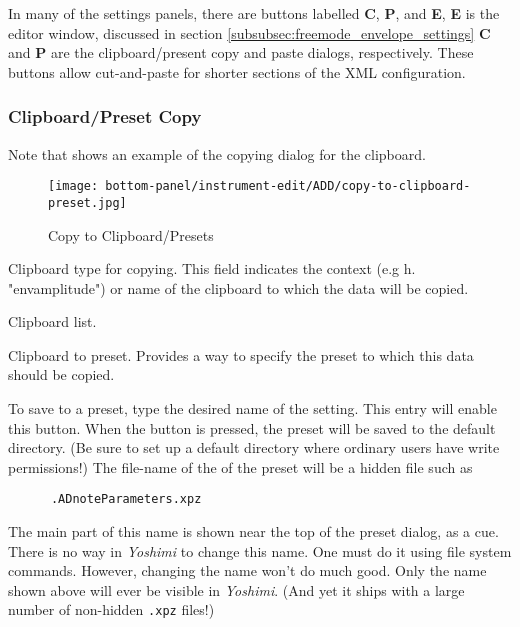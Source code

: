    In many of the settings panels, there are buttons
   labelled \textbf{C}, \textbf{P}, and \textbf{E},
   \textbf{E} is the editor window, discussed in 
   section \ref{subsubsec:freemode_envelope_settings}
   \textbf{C} and \textbf{P} are the clipboard/present copy and paste
   dialogs, respectively.
   These buttons allow cut-and-paste for shorter sections of the XML
   configuration.

\subsubsection{Clipboard/Preset Copy}
\label{subsubsec:clipboard_copy}

   Note that 
   shows an example of the copying dialog for the clipboard.

\begin{figure}[H]
   \centering 
   \texttt{[image: bottom-panel/instrument-edit/ADD/copy-to-clipboard-preset.jpg]}
   \caption[Copy to Clipboard]{Copy to Clipboard/Presets}
   \label{fig:copy_to_clipboard} 
\end{figure}

   \setcounter{ItemCounter}{0}      %

   Clipboard type for copying.
   This field indicates the context (e.g h. "envamplitude") or name of the
   clipboard to which the data will be copied.

   Clipboard list.

   Clipboard to preset.
   Provides a way to specify the preset to which this data should be
   copied.

   To save to a preset, type the desired name of the setting.  This entry
   will enable this button.  When the button is pressed, the preset will
   be saved to the default directory.
   (Be sure to set up a default directory where ordinary users have write
   permissions!)
   The file-name of the of the preset will be a hidden file such as

   \begin{verbatim}
      .ADnoteParameters.xpz
   \end{verbatim}

   The main part of this name is shown near the top of the preset dialog, as
   a cue.
   There is no way in \textsl{Yoshimi} to change this name.  One
   must do it using file system commands.  However, changing the name won't
   do much good.  Only the name shown above will ever be visible
   in \textsl{Yoshimi}.
   (And yet it ships with a large number of non-hidden \texttt{.xpz} files!)

